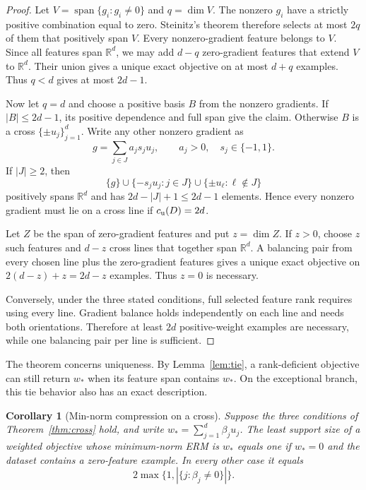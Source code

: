 \documentclass[twoside]{article}
\newtheorem{corollary}[theorem]{Corollary}
\newcommand{\R}{\mathbb R}
\newcommand{\spanop}{\operatorname{span}}
\begin{document}
\begin{proof}
Let $V=\spanop\{g_i:g_i\neq0\}$ and $q=\dim V$. The nonzero $g_i$ have a strictly positive combination equal to zero. Steinitz's theorem therefore selects at most $2q$ of them that positively span $V$. Every nonzero-gradient feature belongs to $V$. Since all features span $\R^d$, we may add $d-q$ zero-gradient features that extend $V$ to $\R^d$. Their union gives a unique exact objective on at most $d+q$ examples. Thus $q<d$ gives at most $2d-1$.

Now let $q=d$ and choose a positive basis $B$ from the nonzero gradients. If $|B|\leq2d-1$, its positive dependence and full span give the claim. Otherwise $B$ is a cross $\{\pm u_j\}_{j=1}^d$. Write any other nonzero gradient as
\begin{equation}
 g=\sum_{j\in J}a_j s_j u_j,
 \qquad a_j>0,\quad s_j\in\{-1,1\}.
\end{equation}
If $|J|\geq2$, then
\begin{equation}
 \{g\}\cup\{-s_j u_j:j\in J\}
 \cup\{\pm u_\ell:\ell\notin J\}
 \label{eq:replacement-cross}
\end{equation}
positively spans $\R^d$ and has $2d-|J|+1\leq2d-1$ elements. Hence every nonzero gradient must lie on a cross line if $c_{\rm u}(D)=2d$.

Let $Z$ be the span of zero-gradient features and put $z=\dim Z$. If $z>0$, choose $z$ such features and $d-z$ cross lines that together span $\R^d$. A balancing pair from every chosen line plus the zero-gradient features gives a unique exact objective on $2(d-z)+z=2d-z$ examples. Thus $z=0$ is necessary.

Conversely, under the three stated conditions, full selected feature rank requires using every line. Gradient balance holds independently on each line and needs both orientations. Therefore at least $2d$ positive-weight examples are necessary, while one balancing pair per line is sufficient.
\end{proof}

The theorem concerns uniqueness. By Lemma~\ref{lem:tie}, a rank-deficient objective can still return $w_*$ when its feature span contains $w_*$. On the exceptional branch, this tie behavior also has an exact description.

\begin{corollary}[Min-norm compression on a cross]
\label{cor:cross-compression}
Suppose the three conditions of Theorem~\ref{thm:cross} hold, and write $w_*=\sum_{j=1}^d\beta_ju_j$. The least support size of a weighted objective whose minimum-norm ERM is $w_*$ equals one if $w_*=0$ and the dataset contains a zero-feature example. In every other case it equals
\begin{equation}
 2\max\{1,|\{j:\beta_j\neq0\}|\}.
 \label{eq:cross-compression}
\end{equation}
\end{corollary}
\end{document}
